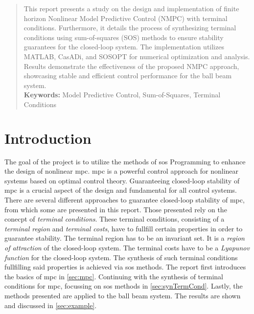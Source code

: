 \documentclass[10pt,a4paper,titlepage]{article}
\begin{document}
\vskip 0.5cm

\begin{abstract}

This report presents a study on the design and implementation of finite horizon Nonlinear Model Predictive Control (NMPC) with terminal conditions.
Furthermore, it details the process of synthesizing terminal conditions using sum-of-squares (SOS) methods to ensure stability guarantees for the closed-loop system.
The implementation utilizes MATLAB, CasADi, and SOSOPT for numerical
optimization and analysis. Results demonstrate the effectiveness of the proposed NMPC approach, showcasing stable and efficient control performance
for the ball beam system.\\

\noindent
\textbf{Keywords:} Model Predictive Control, Sum-of-Squares, Terminal Conditions

\end{abstract}

\vskip 0.5cm


\section{Introduction}
The goal of the project is to utilize the methods of \gls{sos} Programming to enhance the design of nonlinear \gls{mpc}.
\gls{mpc} is a powerful control approach for nonlinear systems based on optimal control theory.
Guaranteeing closed-loop stability of \gls{mpc} is a crucial aspect of the design and fundamental for all control systems.
There are several different approaches to guarantee closed-loop stability of \gls{mpc}, from which some are presented in this report.
Those presented rely on the conecpt of \textit{terminal conditions}. These terminal conditions, consisting of a \textit{terminal region} 
and \textit{terminal costs}, have to fullfill certain properties in order to guarantee stability. The terminal region has to be an invariant set.
It is a \textit{region of attraction} of the closed-loop system. The terminal costs have to be a \textit{Lyapunov function} for the closed-loop system.
The synthesis of such terminal conditions fullfilling said properties is achieved via \gls{sos} methods. The report first introduces the basics of \gls{mpc} in \ref{sec:mpc}.
Continuing with the synthesis of terminal conditions for \gls{mpc},
focussing on \gls{sos} methods in \ref{sec:synTermCond}. Lastly, the methods presented are applied to the 
ball beam system. The results are shown and discussed in \ref{sec:example}.
\end{document}
